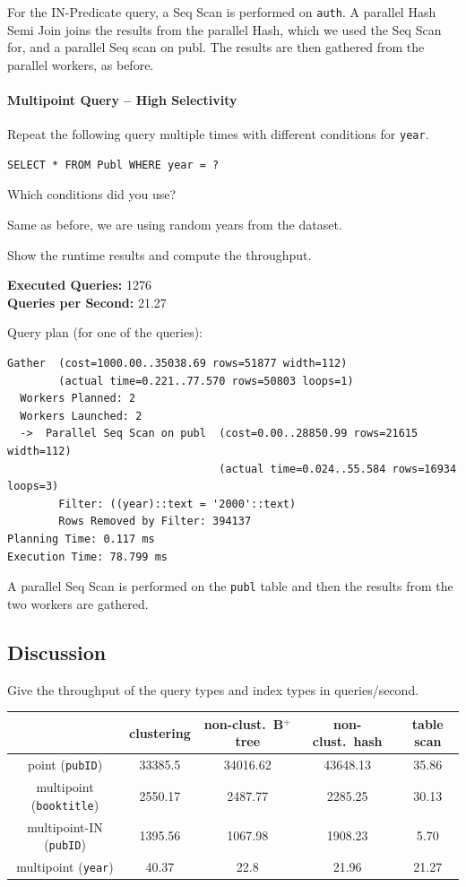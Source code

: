 \documentclass[11pt]{scrartcl}
\begin{document}
For the IN-Predicate query, a Seq Scan is performed on \texttt{auth}.
A parallel Hash Semi Join joins the results from the parallel Hash, which we used the Seq Scan for, and a parallel Seq
scan on publ.
The results are then gathered from the parallel workers, as before.

\paragraph{Multipoint Query -- High Selectivity}

Repeat the following query multiple times with different conditions for \texttt{year}.

\begin{lstlisting}[style=dbtsql]
SELECT * FROM Publ WHERE year = ?
\end{lstlisting}

Which conditions did you use?

Same as before, we are using random years from the dataset.

Show the runtime results and compute the throughput.

\textbf{Executed Queries: } 1276\\
\textbf{Queries per Second: } 21.27

Query plan (for one of the queries):

{\small
\parskip0pt\begin{verbatim}
Gather  (cost=1000.00..35038.69 rows=51877 width=112)
        (actual time=0.221..77.570 rows=50803 loops=1)
  Workers Planned: 2
  Workers Launched: 2
  ->  Parallel Seq Scan on publ  (cost=0.00..28850.99 rows=21615 width=112)
                                 (actual time=0.024..55.584 rows=16934 loops=3)
        Filter: ((year)::text = '2000'::text)
        Rows Removed by Filter: 394137
Planning Time: 0.117 ms
Execution Time: 78.799 ms
\end{verbatim}}

A parallel Seq Scan is performed on the \texttt{publ} table and then the results from the two workers are gathered.

\subsection*{Discussion}

Give the throughput of the query types and index types in queries/second.
\begin{table}[H]
  \centering
  \begin{tabular}{c|c|c|c|c}
    & clustering & non-clust.\ B$^+$ tree & non-clust.\ hash & table scan
      \tabularnewline
    \hline
    point (\texttt{pubID}) & 33385.5 & 34016.62 & 43648.13 & 35.86 \tabularnewline
    \hline
    multipoint (\texttt{booktitle}) & 2550.17 & 2487.77 & 2285.25 & 30.13
      \tabularnewline
    \hline
		multipoint-IN (\texttt{pubID}) & 1395.56 & 1067.98 & 1908.23 & 5.70
      \tabularnewline
		\hline
    multipoint (\texttt{year}) & 40.37 & 22.8 & 21.96 & 21.27
      \tabularnewline
  \end{tabular}
\end{table}
\end{document}
